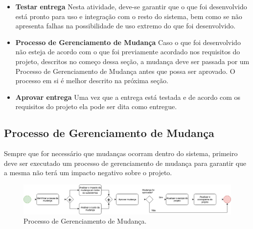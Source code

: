 \begin{itemize}
    \item \textbf{Testar entrega}
        Nesta atividade, deve-se garantir que o que foi desenvolvido está pronto para uso e integração com o resto do sistema, bem como se não apresenta falhas na possibilidade de uso extremo do que foi desenvolvido.

    \item \textbf{Processo de Gerenciamento de Mudança}
        Caso o que foi desenvolvido não esteja de acordo com o que foi previamente acordado nos requisitos do projeto, descritos no começo dessa seção, a mudança deve ser passada por um Processo de Gerenciamento de Mudança antes que possa ser aprovado. O processo em si é melhor descrito na próxima seção.

    \item \textbf{Aprovar entrega}
        Uma vez que a entrega está testada e de acordo com os requisitos do projeto ela pode ser dita como entregue.
\end{itemize}

\subsection{Processo de Gerenciamento de Mudança}
    Sempre que for necessário que mudanças ocorram dentro do sistema, primeiro deve ser executado um processo de gerenciamento de mudança para garantir que a mesma não terá um impacto negativo sobre o projeto.

\begin{figure}[!ht]
	\centering
		\includegraphics[scale=0.4]{figuras/mudanca}
	\caption{Processo de Gerenciamento de Mudança.}
\end{figure}

